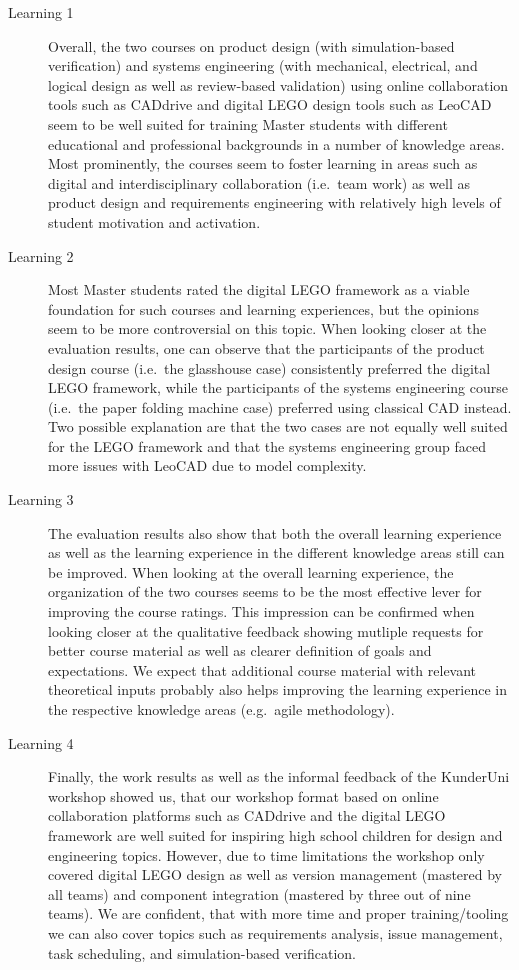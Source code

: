 \documentclass{PDS}
\begin{document}
\begin{description}
    \item[Learning 1]
    Overall, the two courses on product design (with simulation-based verification) and systems engineering (with mechanical, electrical, and logical design as well as review-based validation) using online collaboration tools such as CADdrive and digital LEGO design tools such as LeoCAD seem to be well suited for training Master students with different educational and professional backgrounds in a number of knowledge areas. Most prominently, the courses seem to foster learning in areas such as digital and interdisciplinary collaboration (i.e.\ team work) as well as product design and requirements engineering with relatively high levels of student motivation and activation.
    \item[Learning 2]
    Most Master students rated the digital LEGO framework as a viable foundation for such courses and learning experiences, but the opinions seem to be more controversial on this topic.
    When looking closer at the evaluation results, one can observe that the participants of the product design course (i.e.\ the glasshouse case) consistently preferred the digital LEGO framework, while the participants of the systems engineering course (i.e.\ the paper folding machine case) preferred using classical CAD instead.
    Two possible explanation are that the two cases are not equally well suited for the LEGO framework and that the systems engineering group faced more issues with LeoCAD due to model complexity.
    \item[Learning 3]
    The evaluation results also show that both the overall learning experience as well as the learning experience in the different knowledge areas still can be improved.
    When looking at the overall learning experience, the organization of the two courses seems to be the most effective lever for improving the course ratings.
    This impression can be confirmed when looking closer at the qualitative feedback showing mutliple requests for better course material as well as clearer definition of goals and expectations.
    We expect that additional course material with relevant theoretical inputs probably also helps improving the learning experience in the respective knowledge areas (e.g.\ agile methodology).
    \item[Learning 4]
    Finally, the work results as well as the informal feedback of the KunderUni workshop showed us, that our workshop format based on online collaboration platforms such as CADdrive and the digital LEGO framework are well suited for inspiring high school children for design and engineering topics.
    However, due to time limitations the workshop only covered digital LEGO design as well as version management (mastered by all teams) and component integration (mastered by three out of nine teams).
    We are confident, that with more time and proper training/tooling we can also cover topics such as requirements analysis, issue management, task scheduling, and simulation-based verification.
\end{description}
\end{document}

